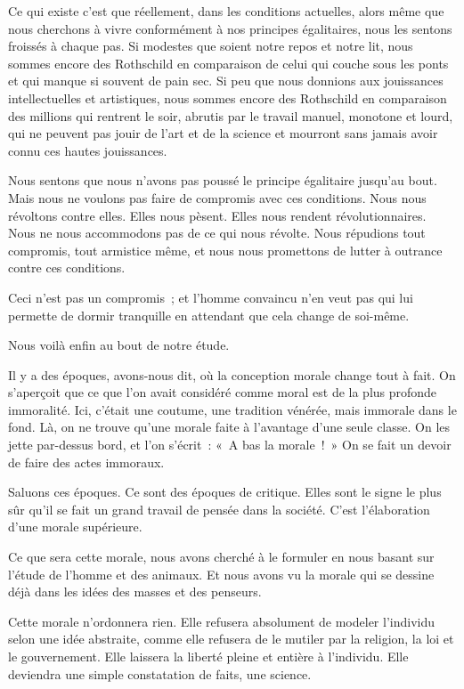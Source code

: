 \documentclass[french,twoside]{book} %
\begin{document}
Ce qui existe c’est que réellement, dans les conditions actuelles, alors même que nous cherchons à vivre conformément à nos principes égalitaires, nous les sentons froissés à chaque pas. Si modestes que soient notre repos et notre lit, nous sommes encore des Rothschild en comparaison de celui qui couche sous les ponts et qui manque si souvent de pain sec. Si peu que nous donnions aux jouissances intellectuelles et artistiques, nous sommes encore des Rothschild en comparaison des millions qui rentrent le soir, abrutis par le travail manuel, monotone et lourd, qui ne peuvent pas jouir de l’art et de la science et mourront sans jamais avoir connu ces hautes jouissances.\par
Nous sentons que nous n’avons pas poussé le principe égalitaire jusqu’au bout. Mais nous ne voulons pas faire de compromis avec ces conditions. Nous nous révoltons contre elles. Elles nous pèsent. Elles nous rendent révolutionnaires. Nous ne nous accommodons pas de ce qui nous révolte. Nous répudions tout compromis, tout armistice même, et nous nous promettons de lutter à outrance contre ces conditions.\par
Ceci n’est pas un compromis ; et l’homme convaincu n’en veut pas qui lui permette de dormir tranquille en attendant que cela change de soi-même.\par
\bigbreak
\noindent Nous voilà enfin au bout de notre étude.\par
Il y a des époques, avons-nous dit, où la conception morale change tout à fait. On s’aperçoit que ce que l’on avait considéré comme moral est de la plus profonde immoralité. Ici, c’était une coutume, une tradition vénérée, mais immorale dans le fond. Là, on ne trouve qu’une morale faite à l’avantage d’une seule classe. On les jette par-dessus bord, et l’on s’écrit : « A bas la morale ! » On se fait un devoir de faire des actes immoraux.\par
Saluons ces époques. Ce sont des époques de critique. Elles sont le signe le plus sûr qu’il se fait un grand travail de pensée dans la société. C’est l’élaboration d’une morale supérieure.\par
Ce que sera cette morale, nous avons cherché à le formuler en nous basant sur l’étude de l’homme et des animaux. Et nous avons vu la  morale qui se dessine déjà dans les idées des masses et des penseurs.\par
Cette morale n’ordonnera rien. Elle refusera absolument de modeler l’individu selon une idée abstraite, comme elle refusera de le mutiler par la religion, la loi et le gouvernement. Elle laissera la liberté pleine et entière à l’individu. Elle deviendra une simple constatation de faits, une science.\par
\end{document}
